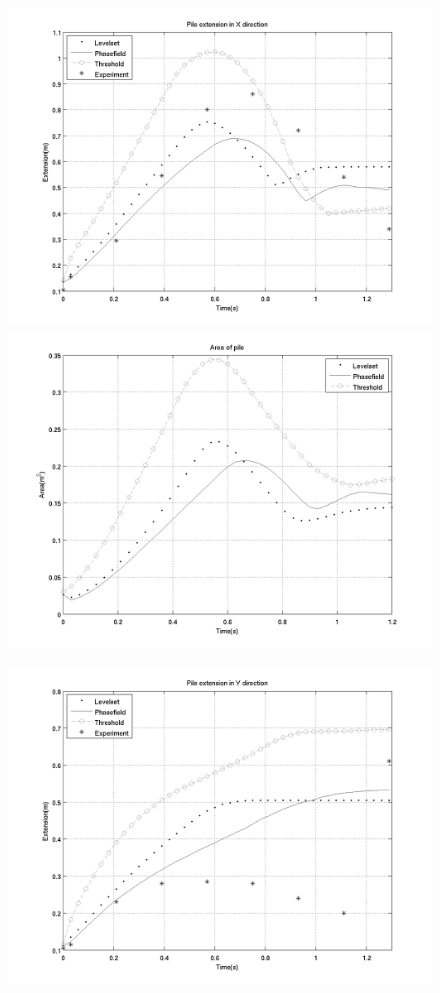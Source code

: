 \documentclass[letterpaper,10pt]{article}
\begin{document}
\begin{figure}[H]
  \begin{minipage}[b]{.48\linewidth}
    \centering
    \includegraphics[scale=0.4]{IMAGES/xextend.png}
    \includegraphics[scale=0.4]{IMAGES/area.png}
  \end{minipage}
  \begin{minipage}[b]{.48 \linewidth}
    \centering
    \includegraphics[scale=0.4]{IMAGES/yextend.png}

\end{minipage}
\end{figure}
\end{document}
